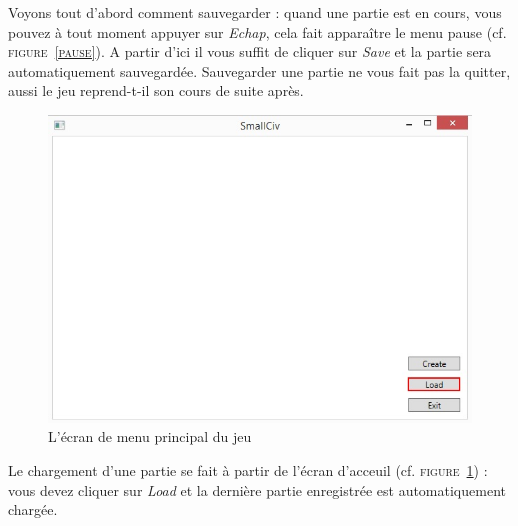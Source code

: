 Voyons tout d'abord comment sauvegarder : quand une partie est en cours, vous pouvez à tout moment appuyer sur \emph{Echap}, cela fait apparaître le menu pause (cf. \textsc{figure~\ref{pause}}). A partir d'ici il vous suffit de cliquer sur \emph{Save} et la partie sera automatiquement sauvegardée. Sauvegarder une partie ne vous fait pas la quitter, aussi le jeu reprend-t-il son cours de suite après. \newline

\begin{figure}
	\centering
	\includegraphics{img/acceuil_to_load.jpg}
	\caption{L'écran de menu principal du jeu}
	\label{start2}
\end{figure}
Le chargement d'une partie se fait à partir de l'écran d'acceuil (cf. \textsc{figure~\ref{start2}}) : vous devez cliquer sur \emph{Load} et la dernière partie enregistrée est automatiquement chargée. 


